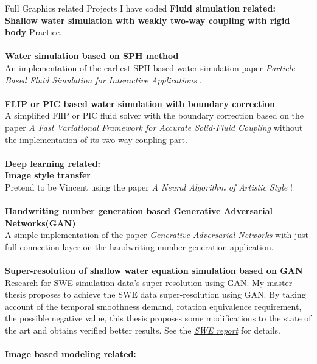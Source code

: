 \documentclass{article} %
\begin{document}
\begin{section}{Full Graphics related Projects I have coded}
         \textbf{Fluid simulation related:}\\
                {\bf Shallow water simulation with weakly two-way coupling with rigid body} Practice.\\\\
                {\bf Water simulation based on SPH method}\\An implementation of the earliest SPH based water simulation paper \emph{Particle-Based Fluid Simulation for Interactive Applications} \cite{muller2003particle}.\\\\                
                {\bf FLIP or PIC based water simulation with boundary correction}\\A simplified FlIP or PIC fluid solver with the boundary correction based on the paper \emph{A Fast Variational Framework for Accurate Solid-Fluid Coupling} \cite{batty2007fast} without the implementation of its two way coupling part.\\\\
         \textbf{Deep learning related:}\\
                {\bf Image style transfer}\\Pretend to be Vincent using the paper \emph{A Neural Algorithm of Artistic Style} \cite{gatys2015neural}!\\\\
                {\bf Handwriting number generation based Generative Adversarial Networks(GAN)}\\ A simple implementation of the paper \emph{Generative Adversarial Networks} \cite{radford2015unsupervised} with just full connection layer on the handwriting number generation application.\\\\
                {\bf Super-resolution of shallow water equation simulation based on GAN}\\ Research for SWE simulation data's super-resolution using GAN. My master thesis proposes to achieve the SWE data super-resolution using GAN. By taking account of the temporal smoothness demand, rotation equivalence requirement, the possible negative value, this thesis proposes some modifications to the state of the art and obtains verified better results. See the \emph{\href{https://wtyatzoo.github.io/reports/SWE.pdf}{SWE report}} for details.  \\\\        
        \textbf{Image based modeling related:}\\

\end{section}
\end{document}
